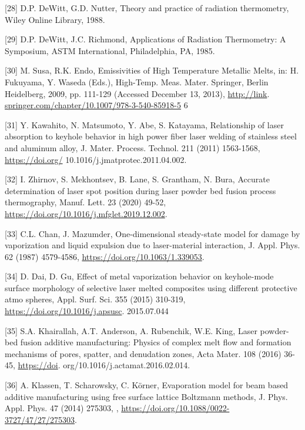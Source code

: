 \documentclass[10pt]{article}
\begin{document}
[28] D.P. DeWitt, G.D. Nutter, Theory and practice of radiation thermometry, Wiley Online Library, 1988.

[29] D.P. DeWitt, J.C. Richmond, Applications of Radiation Thermometry: A Symposium, ASTM International, Philadelphia, PA, 1985.

[30] M. Susa, R.K. Endo, Emissivities of High Temperature Metallic Melts, in: H. Fukuyama, Y. Waseda (Eds.), High-Temp. Meas. Mater. Springer, Berlin Heidelberg, 2009, pp. 111-129 (Accessed December 13, 2013), \href{http://link}{http://link}. \href{http://springer.com/chapter/10.1007/978-3-540-85918-5}{springer.com/chapter/10.1007/978-3-540-85918-5} 6

[31] Y. Kawahito, N. Matsumoto, Y. Abe, S. Katayama, Relationship of laser absorption to keyhole behavior in high power fiber laser welding of stainless steel and aluminum alloy, J. Mater. Process. Technol. 211 (2011) 1563-1568, \href{https://doi.org/}{https://doi.org/} 10.1016/j.jmatprotec.2011.04.002.

[32] I. Zhirnov, S. Mekhontsev, B. Lane, S. Grantham, N. Bura, Accurate determination of laser spot position during laser powder bed fusion process thermography, Manuf. Lett. 23 (2020) 49-52, \href{https://doi.org/10.1016/j.mfglet.2019.12.002}{https://doi.org/10.1016/j.mfglet.2019.12.002}.

[33] C.L. Chan, J. Mazumder, One-dimensional steady-state model for damage by vaporization and liquid expulsion due to laser-material interaction, J. Appl. Phys. 62 (1987) 4579-4586, \href{https://doi.org/10.1063/1.339053}{https://doi.org/10.1063/1.339053}.

[34] D. Dai, D. Gu, Effect of metal vaporization behavior on keyhole-mode surface morphology of selective laser melted composites using different protective atmo spheres, Appl. Surf. Sci. 355 (2015) 310-319, \href{https://doi.org/10.1016/j.apsusc}{https://doi.org/10.1016/j.apsusc}. 2015.07.044

[35] S.A. Khairallah, A.T. Anderson, A. Rubenchik, W.E. King, Laser powder-bed fusion additive manufacturing: Physics of complex melt flow and formation mechanisms of pores, spatter, and denudation zones, Acta Mater. 108 (2016) 36-45, \href{https://doi}{https://doi}. org/10.1016/j.actamat.2016.02.014.

[36] A. Klassen, T. Scharowsky, C. Körner, Evaporation model for beam based additive manufacturing using free surface lattice Boltzmann methods, J. Phys. Appl. Phys. 47 (2014) 275303, , \href{https://doi.org/10.1088/0022-3727/47/27/275303}{https://doi.org/10.1088/0022-3727/47/27/275303}.
\end{document}

